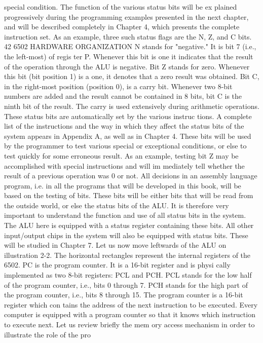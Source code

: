 \documentclass{book}
\begin{document}
special condition. The function of the various status bits will be ex
plained progressively during the programming examples presented
in the next chapter, and will be described completely in Chapter
4, which presents the complete instruction set. As an example,
three such status flags are the N, Z, and C bits.
42
6502 HARDWARE ORGANIZATION
N stands for "negative." It is bit 7 (i.e., the left-most) of regis
ter P. Whenever this bit is one it indicates that the result of the
operation through the ALU is negative.
Bit Z stands for zero. Whenever this bit (bit position 1) is a one,
it denotes that a zero result was obtained.
Bit C, in the right-most position (position 0), is a carry bit.
Whenever two 8-bit numbers are added and the result cannot be
contained in 8 bits, bit C is the ninth bit of the result. The carry is
used extensively during arithmetic operations.
These status bits are automatically set by the various instruc
tions. A complete list of the instructions and the way in which
they affect the status bits of the system appears in Appendix A, as
well as in Chapter 4. These bits will be used by the programmer to
test various special or exceptional conditions, or else to test
quickly for some erroneous result. As an example, testing bit Z
may be accomplished with special instructions and will im
mediately tell whether the result of a previous operation was 0
or not. All decisions in an assembly language program, i.e. in all
the programs that will be developed in this book, will be based on
the testing of bits. These bits will be either bits that will be read
from the outside world, or else the status bits of the ALU. It is
therefore very important to understand the function and use of all
status bits in the system. The ALU here is equipped with a status
register containing these bits. All other input/output chips in the
system will also be equipped with status bits. These will be
studied in Chapter 7.
Let us now move leftwards of the ALU on illustration 2-2. The
horizontal rectangles represent the internal registers of the 6502.
PC is the program counter. It is a 16-bit register and is physi
cally implemented as two 8-bit registers: PCL and PCH. PCL
stands for the low half of the program counter, i.e., bits 0 through
7. PCH stands for the high part of the program counter, i.e., bits 8
through 15. The program counter is a 16-bit register which con
tains the address of the next instruction to be executed. Every
computer is equipped with a program counter so that it knows
which instruction to execute next. Let us review briefly the mem
ory access mechanism in order to illustrate the role of the pro
\end{document}
